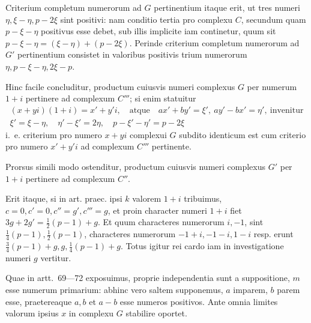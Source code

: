 Criterium completum numerorum ad $G$ pertinentium itaque erit, ut tres numeri $\eta,\xi-\eta,p-2\xi$ sint positivi: nam conditio tertia pro complexu $C$, secundum quam $p-\xi-\eta$ positivus esse debet, sub illis implicite iam continetur, quum sit $p-\xi-\eta=(\xi-\eta)+(p-2\xi)$. Perinde criterium completum numerorum ad $G'$ pertinentium consistet in valoribus positivis trium numerorum $\eta,p-\xi-\eta,2\xi-p$.

Hinc facile concluditur, productum cuiusvis numeri complexus $G$ per numerum $1+i$ pertinere ad complexum $C'''$; si enim statuitur
\[
\begin{gathered}
(x+yi)(1+i)=x'+y'i,\quad\text{atque}\quad ax'+by'=\xi',\ ay'-bx'=\eta',\ \text{invenitur}\\
\xi'=\xi-\eta,\quad\eta'-\xi'=2\eta,\quad p-\xi'-\eta'=p-2\xi
\end{gathered}
\]
i.~e. criterium pro numero $x+yi$ complexui $G$ subdito identicum est cum criterio pro numero $x'+y'i$ ad complexum $C'''$ pertinente.

Prorsus simili modo ostenditur, productum cuiusvis numeri complexus $G'$ per $1+i$ pertinere ad complexum $C''$.

Erit itaque, si in art. praec. ipsi $k$ valorem $1+i$ tribuimus, $c=0,c'=0,c''=g',c'''=g$, et proin character numeri $1+i$ fiet $3g+2g'=\frac12(p-1)+g$. Et quum characteres numerorum $i,-1$, sint $\frac14(p-1),\frac12(p-1)$, characteres numerorum $-1+i,-1-i,1-i$ resp. erunt $\frac34(p-1)+g,g,\frac14(p-1)+g$. Totus igitur rei cardo iam in investigatione numeri $g$ vertitur.

Quae in artt.~69---72 exposuimus, proprie independentia sunt a suppositione, $m$ esse numerum primarium: abhinc vero saltem supponemus, $a$ imparem, $b$ parem esse, praetereaque $a,b$ et $a-b$ esse numeros positivos. Ante omnia limites valorum ipsius $x$ in complexu $G$ stabilire oportet.

